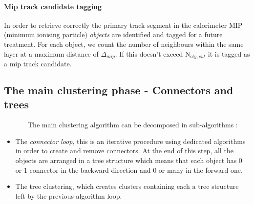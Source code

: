 \documentclass[cits]{JINST}
\begin{document}
\paragraph*{Mip track candidate tagging}
In order to retrieve correctly the primary track segment in the calorimeter MIP (minimum ionising particle) \textit{objects} are identified and tagged for a future treatment.
For each object, we count the number of neighbours within the same layer at a maximum distance of $\Delta_{mip}$. If this doesn't exceed N$_{obj,cut}$ it is tagged as a mip track candidate.

\subsection{The main clustering phase - Connectors and trees}

~~~~~~~The main clustering algorithm can be decomposed in sub-algorithms :
\begin{itemize}
  \item The \textit{connector loop}, this is an iterative procedure using dedicated algorithms in order to create and remove connectors. At the end of this step, all the objects are arranged in a tree structure which means that each object has 0 or 1 connector in the backward direction and 0 or many in the forward one.
  \item The tree clustering, which creates clusters containing each a tree structure left by the previous algorithm loop.
\end{itemize}
\end{document}
